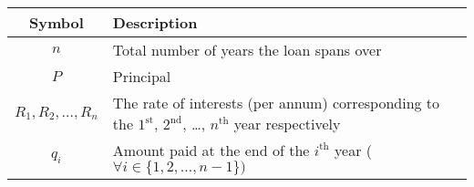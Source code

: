 \begin{tabular}{|c|p{5.4cm}|}
    \hline
        \textbf{Symbol} & \textbf{Description}  \\
    \hline
        $n$ & Total number of years the loan spans over\\
    \hline
        $P$ & Principal\\
    \hline
        $R_1, R_2, \ldots, R_n$ &  The rate of interests (per annum) corresponding to the $1^\text{st}$, $2^\text{nd}$, \ldots, $n^\text{th}$ year respectively\\
    \hline
        $q_i$ & Amount paid at the end of the  $i^\text{th}$ year ( $\forall i\in \{1,2,\ldots,n-1\})$\\
    \hline
    \end{tabular}